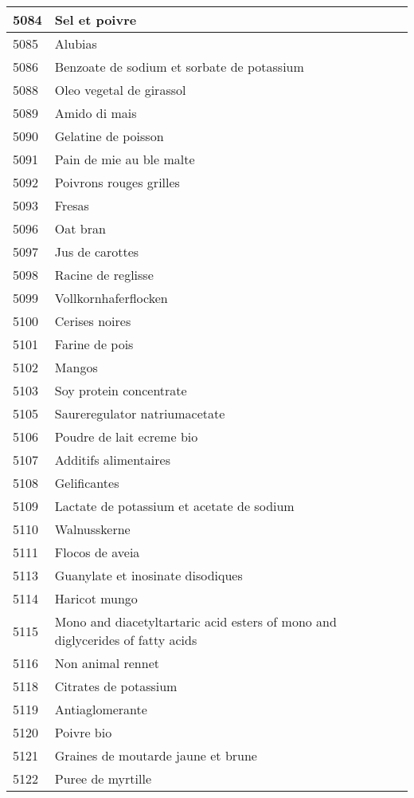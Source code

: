 \begin{longtable}{|l|l|}
5084 & Sel et poivre \\ \hline 
5085 & Alubias \\ \hline 
5086 & Benzoate de sodium et sorbate de potassium \\ \hline 
5088 & Oleo vegetal de girassol \\ \hline 
5089 & Amido di mais \\ \hline 
5090 & Gelatine de poisson \\ \hline 
5091 & Pain de mie au ble malte \\ \hline 
5092 & Poivrons rouges grilles \\ \hline 
5093 & Fresas \\ \hline 
5096 & Oat bran \\ \hline 
5097 & Jus de carottes \\ \hline 
5098 & Racine de reglisse \\ \hline 
5099 & Vollkornhaferflocken \\ \hline 
5100 & Cerises noires \\ \hline 
5101 & Farine de pois \\ \hline 
5102 & Mangos \\ \hline 
5103 & Soy protein concentrate \\ \hline 
5105 & Saureregulator natriumacetate \\ \hline 
5106 & Poudre de lait ecreme bio \\ \hline 
5107 & Additifs alimentaires \\ \hline 
5108 & Gelificantes \\ \hline 
5109 & Lactate de potassium et acetate de sodium \\ \hline 
5110 & Walnusskerne \\ \hline 
5111 & Flocos de aveia \\ \hline 
5113 & Guanylate et inosinate disodiques \\ \hline 
5114 & Haricot mungo \\ \hline 
5115 & Mono and diacetyltartaric acid esters of mono and diglycerides of fatty acids \\ \hline 
5116 & Non animal rennet \\ \hline 
5118 & Citrates de potassium \\ \hline 
5119 & Antiaglomerante \\ \hline 
5120 & Poivre bio \\ \hline 
5121 & Graines de moutarde jaune et brune \\ \hline 
5122 & Puree de myrtille \\ \hline 

\end{longtable}
